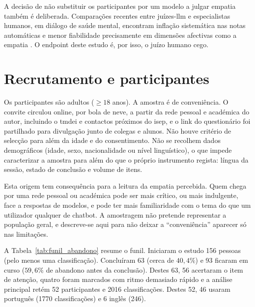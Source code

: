 A decisão de não substituir os participantes por um modelo a julgar empatia também é deliberada. Comparações recentes entre juízes-\gls{llm} e especialistas humanos, em diálogo de saúde mental, encontram inflação sistemática nas notas automáticas e menor fiabilidade precisamente em dimensões afectivas como a empatia \parencite{Badawi2026MentalAlign}. O endpoint deste estudo é, por isso, o juízo humano cego.


\section{Recrutamento e participantes}
\label{sec:recrutamento}

Os participantes são adultos (\(\ge 18\) anos). A amostra é de conveniência. O convite circulou online, por bola de neve, a partir da rede pessoal e académica do autor, incluindo o \gls{tmdei} e contactos próximos do \gls{isep}, e o link do questionário foi partilhado para divulgação junto de colegas e alunos. Não houve critério de selecção para além da idade e do consentimento. Não se recolhem dados demográficos (idade, sexo, nacionalidade ou nível linguístico), o que impede caracterizar a amostra para além do que o próprio instrumento regista: língua da sessão, estado de conclusão e volume de itens.

Esta origem tem consequência para a leitura da empatia percebida. Quem chega por uma rede pessoal ou académica pode ser mais crítico, ou mais indulgente, face a respostas de modelos, e pode ter mais familiaridade com o tema do que um utilizador qualquer de chatbot. A amostragem não pretende representar a população geral, e descreve-se aqui para não deixar a ``conveniência'' aparecer só nas limitações.

A Tabela~\ref{tab:funil_abandono} resume o funil. Iniciaram o estudo 156 pessoas (pelo menos uma classificação). Concluíram 63 (cerca de \(40{,}4\%\)) e 93 ficaram em curso (\(59{,}6\%\) de abandono antes da conclusão). Destes 63, 56 acertaram o item de atenção, quatro foram marcados com ritmo demasiado rápido e a análise principal retém 52 participantes e 2016 classificações. Destes 52, 46 usaram português (1770 classificações) e 6 inglês (246).

